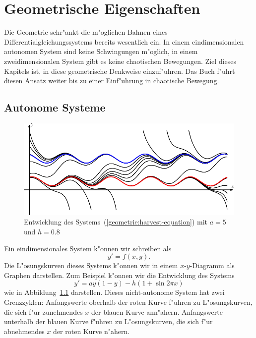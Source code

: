 %
%
%
\chapter{Geometrische Eigenschaften\label{chapter:geometrie}}
\rhead{}
Die Geometrie schr"ankt die m"oglichen Bahnen eines
Differentialgleichungssystems bereits wesentlich ein.
In einem eindimensionalen autonomen System sind keine
Schwingungen m"oglich, in einem zweidimensionalen
System gibt es keine chaotischen Bewegungen.
Ziel dieses Kapitels ist, in diese geometrische
Denkweise einzuf"uhren.
Das Buch \cite{skript:hirsch} f"uhrt diesen Ansatz weiter bis zu
einer Einf"uhrung in chaotische Bewegung.

\section{Autonome Systeme}
\begin{figure}
\centering
\includegraphics{chapters/images/geometrie-13.pdf}
\caption{Entwicklung des Systems~(\ref{geometrie:harvest-equation})
mit $a=5$ und $h=0.8$
\label{geometrie:harvest-graph}}
\end{figure}%
Ein eindimensionales System k"onnen wir schreiben als
\[
y'=f(x,y).
\]
Die L"osungskurven dieses Systems k"onnen wir in einem $x$-$y$-Diagramm
als Graphen darstellen.
Zum Beispiel k"onnen wir die Entwicklung des Systems
\begin{equation}
y' = ay(1-y)-h(1+\sin 2\pi x)
\label{geometrie:harvest-equation}
\end{equation}
wie in Abbildung~\ref{geometrie:harvest-graph} darstellen.
Dieses nicht-autonome System hat zwei Grenzzyklen: 
Anfangswerte oberhalb der roten Kurve f"uhren zu L"osungskurven, die
sich f"ur zunehmendes $x$ der blauen Kurve ann"ahern.
Anfangswerte unterhalb der blauen Kurve f"uhren zu L"osungskurven, die
sich f"ur abnehmendes $x$ der roten Kurve n"ahern.

